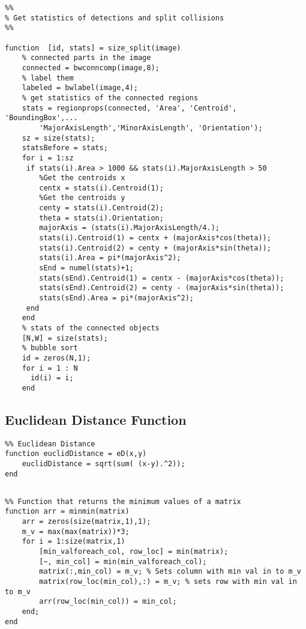 \documentclass{article}
\begin{document}
\begin{lstlisting}
%%
% Get statistics of detections and split collisions
%%

function  [id, stats] = size_split(image)
    % connected parts in the image
    connected = bwconncomp(image,8);
    % label them
    labeled = bwlabel(image,4);
    % get statistics of the connected regions
    stats = regionprops(connected, 'Area', 'Centroid', 'BoundingBox',...
        'MajorAxisLength','MinorAxisLength', 'Orientation');
    sz = size(stats);
    statsBefore = stats;
    for i = 1:sz
     if stats(i).Area > 1000 && stats(i).MajorAxisLength > 50
        %Get the centroids x
        centx = stats(i).Centroid(1);
        %Get the centroids y
        centy = stats(i).Centroid(2); 
        theta = stats(i).Orientation; 
        majorAxis = (stats(i).MajorAxisLength/4.);
        stats(i).Centroid(1) = centx + (majorAxis*cos(theta));
        stats(i).Centroid(2) = centy + (majorAxis*sin(theta));
        stats(i).Area = pi*(majorAxis^2);
        sEnd = numel(stats)+1;
        stats(sEnd).Centroid(1) = centx - (majorAxis*cos(theta)); 
        stats(sEnd).Centroid(2) = centy - (majorAxis*sin(theta));
        stats(sEnd).Area = pi*(majorAxis^2);
     end
    end
    % stats of the connected objects
    [N,W] = size(stats);
    % bubble sort
    id = zeros(N,1);
    for i = 1 : N
      id(i) = i;
    end
\end{lstlisting}

\subsection{Euclidean Distance Function}


\begin{lstlisting}
%% Euclidean Distance
function euclidDistance = eD(x,y) 
    euclidDistance = sqrt(sum( (x-y).^2));
end
\end{lstlisting}

\subsection{}


\begin{lstlisting}
%% Function that returns the minimum values of a matrix
function arr = minmin(matrix)
    arr = zeros(size(matrix,1),1);
    m_v = max(max(matrix))*3;
    for i = 1:size(matrix,1)
        [min_valforeach_col, row_loc] = min(matrix);
        [~, min_col] = min(min_valforeach_col);
        matrix(:,min_col) = m_v; % Sets column with min val in to m_v
        matrix(row_loc(min_col),:) = m_v; % sets row with min val in to m_v
        arr(row_loc(min_col)) = min_col;
    end;
end
\end{lstlisting}
\end{document}
